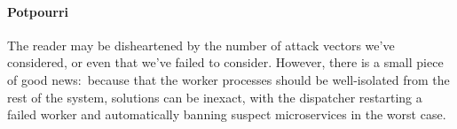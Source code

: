\paragraph{Potpourri}
The reader may be disheartened by the number of attack vectors we've considered, or
even that we've failed to consider.  However, there is a small piece of good news:\
because that the worker processes should be well-isolated from the rest of the
system, solutions can be inexact, with the dispatcher restarting a failed worker and
automatically banning suspect microservices in the worst case.
